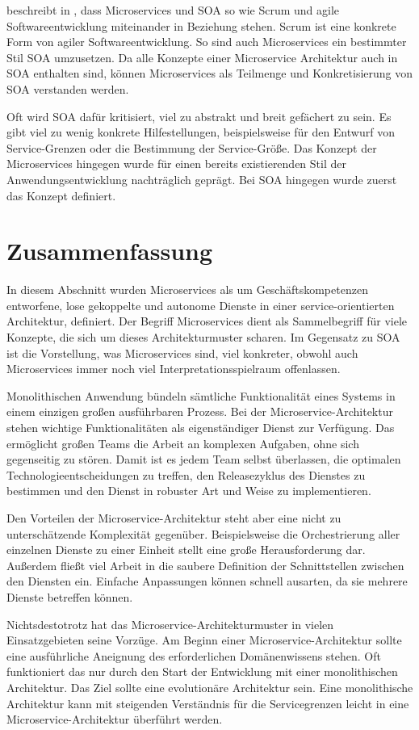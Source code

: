 \citeauthor{newman2015building} beschreibt in \cite{newman2015building}, dass Microservices und SOA so wie Scrum und agile Softwareentwicklung miteinander in Beziehung stehen. Scrum ist eine konkrete Form von agiler Softwareentwicklung. So sind auch Microservices ein bestimmter Stil SOA umzusetzen. Da alle Konzepte einer Microservice Architektur auch in SOA enthalten sind, können Microservices als Teilmenge und Konkretisierung von SOA verstanden werden.

Oft wird SOA dafür kritisiert, viel zu abstrakt und breit gefächert zu sein. Es gibt viel zu wenig konkrete Hilfestellungen, beispielsweise für den Entwurf von Service-Grenzen oder die Bestimmung der Service-Größe. Das Konzept der Microservices hingegen wurde für einen bereits existierenden Stil der Anwendungsentwicklung nachträglich geprägt. Bei SOA hingegen wurde zuerst das Konzept definiert.

\section{Zusammenfassung}

In diesem Abschnitt wurden Microservices als um Geschäftskompetenzen entworfene, lose gekoppelte und autonome Dienste in einer service-orientierten Architektur, definiert. Der Begriff Microservices dient als Sammelbegriff für viele Konzepte, die sich um dieses Architekturmuster scharen. Im Gegensatz zu SOA ist die Vorstellung, was Microservices sind, viel konkreter, obwohl auch Microservices immer noch viel Interpretationsspielraum offenlassen.

Monolithischen Anwendung bündeln sämtliche Funktionalität eines Systems in einem einzigen großen ausführbaren Prozess. Bei der Microservice-Architektur stehen wichtige Funktionalitäten als eigenständiger Dienst zur Verfügung. Das ermöglicht großen Teams die Arbeit an komplexen Aufgaben, ohne sich gegenseitig zu stören. Damit ist es jedem Team selbst überlassen, die optimalen Technologieentscheidungen zu treffen, den Releasezyklus des Dienstes zu bestimmen und den Dienst in robuster Art und Weise zu implementieren.

Den Vorteilen der Microservice-Architektur steht aber eine nicht zu unterschätzende Komplexität gegenüber. Beispielsweise die Orchestrierung aller einzelnen Dienste zu einer Einheit stellt eine große Herausforderung dar. Außerdem fließt viel Arbeit in die saubere Definition der Schnittstellen zwischen den Diensten ein. Einfache Anpassungen können schnell ausarten, da sie mehrere Dienste betreffen können. 

Nichtsdestotrotz hat das Microservice-Architekturmuster in vielen Einsatzgebieten seine Vorzüge. Am Beginn einer Microservice-Architektur sollte eine ausführliche Aneignung des erforderlichen Domänenwissens stehen. Oft funktioniert das nur durch den Start der Entwicklung mit einer monolithischen Architektur. Das Ziel sollte eine evolutionäre Architektur sein. Eine monolithische Architektur kann mit steigenden Verständnis für die Servicegrenzen leicht in eine Microservice-Architektur überführt werden.